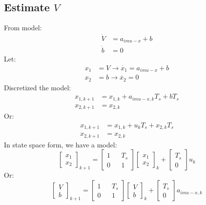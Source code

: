 \documentclass[12pt,a4paper]{article}
\begin{document}
	\subsection{Estimate \(V\)}
	From model:
	\begin{equation}
		\begin{split}
			\dot{V} &= a_{imu-x} + b \\
			\dot{b} &= 0
		\end{split}
		\label{eq8}
	\end{equation}
	Let:
	\[\begin{split}
		x_1 &= V \rightarrow \dot{x_1} = a_{imu-x} + b \\
		x_2 &= b \rightarrow \dot{x_2} = 0
	\end{split}\]
	Discretized the model:
	\[\begin{split}
		x_{1,k+1} &= x_{1,k} + a_{imu-x,k}T_s + bT_s \\
		x_{2,k+1} &= x_{2,k}
	\end{split}\]
	Or:
	\[\begin{split}
		x_{1,k+1} &= x_{1,k} + u_kT_s + x_{2,k}T_s \\
		x_{2,k+1} &= x_{2,k}
	\end{split}\]
	In state space form, we have a model:
	\begin{equation}
		\boxed{
			\begin{bmatrix}
				x_1 \\
				x_2 
			\end{bmatrix}_{k+1} = 
			\begin{bmatrix}
				1 &   & T_s \\
				0 &   & 1   
			\end{bmatrix}
			\begin{bmatrix}
				x_1 \\
				x_2 
			\end{bmatrix}_k +
			\begin{bmatrix}
				T_s \\
				0   
			\end{bmatrix} u_k
		}
		\label{eq9}
	\end{equation}
	Or:
	\begin{equation}
		\boxed{
			\begin{bmatrix}
				V \\
				b 
			\end{bmatrix}_{k+1} = 
			\begin{bmatrix}
				1 &   & T_s \\
				0 &   & 1   
			\end{bmatrix}
			\begin{bmatrix}
				V \\
				b 
			\end{bmatrix}_k +
			\begin{bmatrix}
				T_s \\
				0   
			\end{bmatrix} a_{imu-x,k}
		}
		\label{eq10}
	\end{equation}
\end{document}
